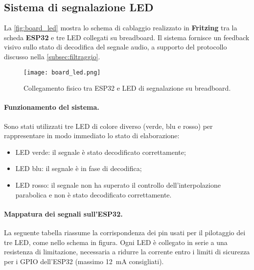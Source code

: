 \subsection{Sistema di segnalazione LED}
\label{subsec:led_system}

La \autoref{fig:board_led} mostra lo schema di cablaggio realizzato in \textbf{Fritzing} tra la scheda \textbf{ESP32} e tre LED collegati su breadboard.  
Il sistema fornisce un feedback visivo sullo stato di decodifica del segnale audio, a supporto del protocollo discusso nella \autoref{subsec:filtraggio}.  

\begin{figure}[H]
  \centering
  \texttt{[image: board\_led.png]}
  \caption{Collegamento fisico tra ESP32 e LED di segnalazione su breadboard.}
  \label{fig:board_led}
\end{figure} 

\newpage
\paragraph{Funzionamento del sistema.}
Sono stati utilizzati tre LED di colore diverso (verde, blu e rosso) per rappresentare in modo immediato lo stato di elaborazione:  
\begin{itemize}
  \item LED verde: il segnale è stato decodificato correttamente;
  \item LED blu: il segnale è in fase di decodifica;
  \item LED rosso: il segnale non ha superato il controllo dell’interpolazione parabolica e non è stato decodificato correttamente.
\end{itemize}

\paragraph{Mappatura dei segnali sull'ESP32.}
La seguente tabella riassume la corrispondenza dei pin usati per il pilotaggio dei tre LED, come nello schema in figura.  
Ogni LED è collegato in serie a una resistenza di limitazione, necessaria a ridurre la corrente entro i limiti di sicurezza per i GPIO dell’ESP32 (massimo \SI{12}{mA} consigliati).


